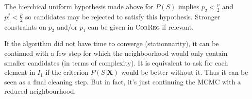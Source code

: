 \documentclass[11pt,a4paper]{article}
\begin{document}
	The hierchical uniform hypothesis made above for $P(S)$ implies $p_2<\frac{p}{2}$ and $p_1^j<\frac{p}{2}$ so candidates may be rejected to satisfy this hypothesis. Stronger constraints on $p_2$ and/or $p_1$ can be given in \textsc{CorReg} if relevant.
	
If the algorithm did not have time to converge (stationnarity), it can be continued with a few step for which the neighboorhood would only contain smaller candidates (in terms of complexity). It is equivalent to ask for each element in $I_1$ if the criterion $P(S|\boldsymbol{X})$ would be better without it. Thus it can be seen as a final cleaning step. But in fact, it's just continuing the MCMC with a reduced neighbourhood.	
	
	
	
\end{document}
